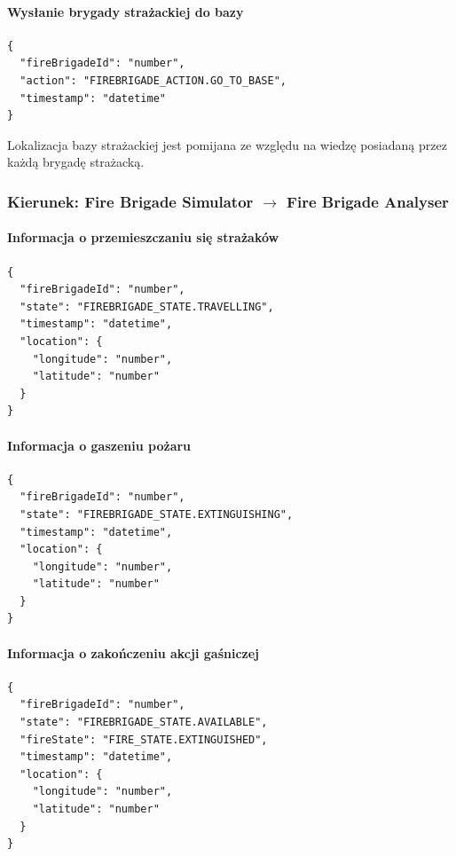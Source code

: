 \documentclass[11pt,a4paper]{article}
\begin{document}
\paragraph{Wysłanie brygady strażackiej do bazy}

\begin{verbatim}
{
  "fireBrigadeId": "number",
  "action": "FIREBRIGADE_ACTION.GO_TO_BASE",
  "timestamp": "datetime"
}
\end{verbatim}

Lokalizacja bazy strażackiej jest pomijana ze względu na wiedzę posiadaną przez każdą brygadę strażacką.

\subsubsection*{Kierunek: Fire Brigade Simulator $\rightarrow$ Fire Brigade Analyser}

\paragraph{Informacja o przemieszczaniu się strażaków}

\begin{verbatim}
{
  "fireBrigadeId": "number",
  "state": "FIREBRIGADE_STATE.TRAVELLING",
  "timestamp": "datetime",
  "location": {
    "longitude": "number",
    "latitude": "number"
  }
}
\end{verbatim}

\paragraph{Informacja o gaszeniu pożaru}

\begin{verbatim}
{
  "fireBrigadeId": "number",
  "state": "FIREBRIGADE_STATE.EXTINGUISHING",
  "timestamp": "datetime",
  "location": {
    "longitude": "number",
    "latitude": "number"
  }
}
\end{verbatim}

\paragraph{Informacja o zakończeniu akcji gaśniczej}

\begin{verbatim}
{
  "fireBrigadeId": "number",
  "state": "FIREBRIGADE_STATE.AVAILABLE",
  "fireState": "FIRE_STATE.EXTINGUISHED",
  "timestamp": "datetime",
  "location": {
    "longitude": "number",
    "latitude": "number"
  }
}
\end{verbatim}
\end{document}
